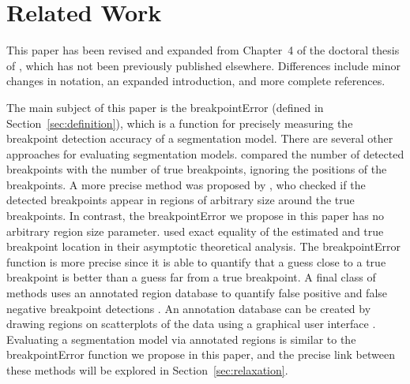 \documentclass{jsfds} %
\begin{document}
\newpage

\section{Related Work}

This paper has been revised and expanded from Chapter~4 of the
doctoral thesis of \citet{HOCKING-phd-ch4}, which has not been
previously published elsewhere. Differences include minor changes
in notation, an expanded introduction, and more complete references.

The main subject of this paper is the breakpointError (defined in
Section~\ref{sec:definition}), which is a function for precisely
measuring the breakpoint detection accuracy of a segmentation
model. There are several other approaches for evaluating segmentation
models. \citet{zaid-lasso} compared the number of detected breakpoints
with the number of true breakpoints, ignoring the positions of the
breakpoints. A more precise method was proposed by
\citet{perf-eval-framework}, who checked if the detected breakpoints
appear in regions of arbitrary size around the true breakpoints. In
contrast, the breakpointError we propose in this paper has no
arbitrary region size parameter. \citet{group-fused} used exact
equality of the estimated and true breakpoint location in their
asymptotic theoretical analysis. The breakpointError function is more
precise since it is able to quantify that a guess close to a true
breakpoint is better than a guess far from a true breakpoint. A final
class of methods uses an annotated region database to quantify false
positive and false negative breakpoint detections
\citep{HOCKING-breakpoints, HOCKING-penalties}. An annotation database
can be created by drawing regions on scatterplots of the data using a
graphical user interface \citep{SegAnnDB}. Evaluating a segmentation
model via annotated regions is similar to the breakpointError function
we propose in this paper, and the precise link between these methods
will be explored in Section~\ref{sec:relaxation}.
\end{document}
